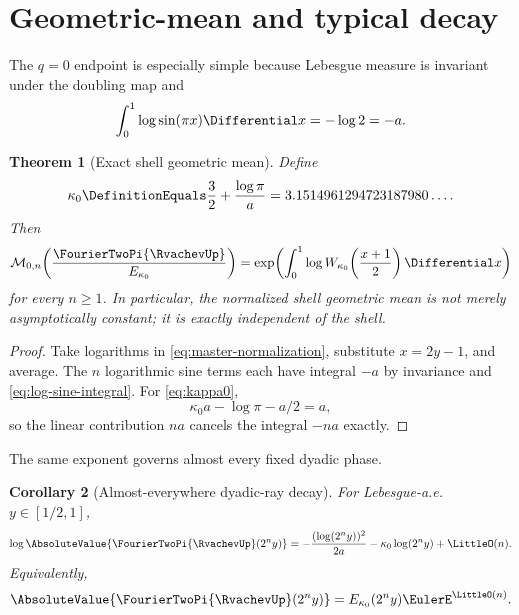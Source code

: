 \documentclass[11pt,oneside]{article}
\numberwithin{equation}{section}
\newtheorem{theorem}{Theorem}[section]
\newtheorem{corollary}[theorem]{Corollary}
\theoremstyle{definition}
\theoremstyle{remark}
\begin{document}
\section{Geometric-mean and typical decay}
\label{sec:typical}

The $q=0$ endpoint is especially simple because Lebesgue measure is invariant under the
doubling map and
\begin{equation}
 \int_0^1\log\sin(\pi x)\Differential x=-\log2=-a.
 \label{eq:log-sine-integral}
\end{equation}

\begin{theorem}[Exact shell geometric mean]
\label{thm:geometric-mean}
Define
\begin{equation}
 \kappa_0\DefinitionEquals\frac32+\frac{\log\pi}{a}
 =3.1514961294723187980\ldots .
 \label{eq:kappa0}
\end{equation}
Then
\begin{equation}
 \mathcal M_{0,n}\!\left(\frac{\FourierTwoPi{\RvachevUp}}{E_{\kappa_0}}\right)
 =\exp\!\left(\int_0^1
    \log W_{\kappa_0}\!\left(\frac{x+1}{2}\right)\Differential x\right)
 \label{eq:exact-geometric-mean}
\end{equation}
for every $n\ge1$.  In particular, the normalized shell geometric mean is not merely
asymptotically constant; it is exactly independent of the shell.
\end{theorem}

\begin{proof}
Take logarithms in \eqref{eq:master-normalization}, substitute $x=2y-1$, and average.
The $n$ logarithmic sine terms each have integral $-a$ by invariance and
\eqref{eq:log-sine-integral}.  For \eqref{eq:kappa0},
\[
 \kappa_0a-\log\pi-a/2=a,
\]
so the linear contribution $na$ cancels the integral $-na$ exactly.
\end{proof}

The same exponent governs almost every fixed dyadic phase.

\begin{corollary}[Almost-everywhere dyadic-ray decay]
\label{cor:typical-ray}
For Lebesgue-a.e. $y\in[1/2,1]$,
\begin{equation}
 \log\AbsoluteValue{\FourierTwoPi{\RvachevUp}(2^ny)}
 =-\frac{(\log(2^ny))^2}{2a}
  -\kappa_0\log(2^ny)+\LittleO(n).
 \label{eq:typical-ray}
\end{equation}
Equivalently,
\[
 \AbsoluteValue{\FourierTwoPi{\RvachevUp}(2^ny)}=E_{\kappa_0}(2^ny)\EulerE^{\LittleO(n)}.
\]
\end{corollary}
\end{document}
